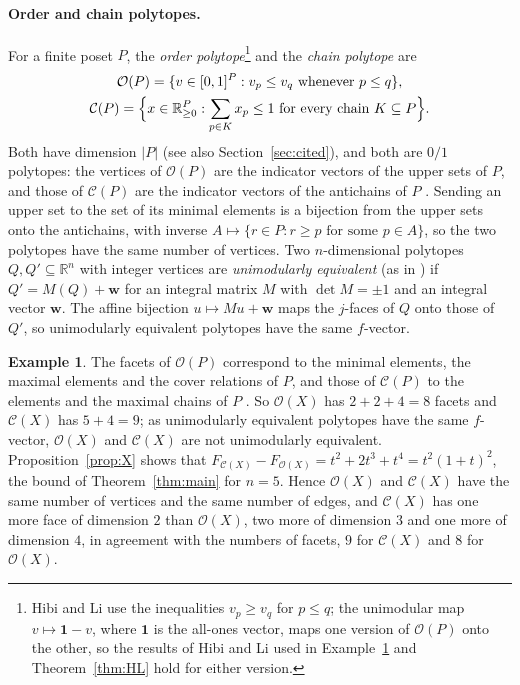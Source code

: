 \documentclass[11pt]{article}
\theoremstyle{definition}
\newtheorem{example}[theorem]{Example}
\theoremstyle{remark}
\newcommand{\OO}{\mathcal O}
\newcommand{\CC}{\mathcal C}
\begin{document}
\paragraph{Order and chain polytopes.}
For a finite poset $P$, the \emph{order polytope}\footnote{Hibi and Li \cite{HL} use the inequalities $v_p\geq v_q$ for $p\leq q$; the unimodular map $v\mapsto\mathbf1-v$, where $\mathbf1$ is the all-ones vector, maps one version of $\OO(P)$ onto the other, so the results of Hibi and Li used in Example~\ref{ex:X} and Theorem~\ref{thm:HL} hold for either version.} and the \emph{chain polytope} are
\begin{gather*}
\OO(P)=\{v\in[0,1]^P: v_p\leq v_q \text{ whenever } p\leq q\},\\
\CC(P)=\Bigl\{x\in\mathbb R_{\geq0}^P:\sum_{p\in K}x_p\leq1
 \text{ for every chain } K\subseteq P\Bigr\}.
\end{gather*}
Both have dimension $|P|$ (see also Section~\ref{sec:cited}), and both are $0/1$ polytopes: the vertices of $\OO(P)$ are the indicator
vectors of the upper sets of $P$, and those of $\CC(P)$ are the indicator vectors of the antichains
of $P$ \cite[Corollary~1.3 and Theorem~2.2]{Stanley}. Sending an upper set to the set of its minimal elements is
a bijection from the upper sets onto the antichains, with inverse $A\mapsto\{r\in P:r\geq p\text{ for some }p\in A\}$,
so the two polytopes have the same number of vertices. Two $n$-dimensional polytopes $Q,Q'\subseteq\mathbb R^n$ with integer vertices are
\emph{unimodularly equivalent} (as in \cite{HL}) if $Q'=M(Q)+\mathbf w$
for an integral matrix $M$ with $\det M=\pm1$ and an integral vector
$\mathbf w$. The affine bijection $u\mapsto Mu+\mathbf w$ maps the $j$-faces of $Q$ onto those of $Q'$, so
unimodularly equivalent polytopes have the same $f$-vector.

\begin{example}\label{ex:X}
The facets of $\OO(P)$ correspond to the minimal elements, the maximal elements and the cover
relations of $P$, and those of $\CC(P)$ to the elements and the maximal chains of $P$
\cite[Lemma~1.1]{HL}. So $\OO(X)$ has $2+2+4=8$ facets and $\CC(X)$ has $5+4=9$; as unimodularly
equivalent polytopes have the same $f$-vector, $\OO(X)$ and $\CC(X)$ are not unimodularly equivalent.
Proposition~\ref{prop:X} shows that
$F_{\CC(X)}-F_{\OO(X)}=t^2+2t^3+t^4=t^2(1+t)^2$, the bound of
Theorem~\ref{thm:main} for $n=5$. Hence $\OO(X)$ and $\CC(X)$ have the same number of vertices and the same number of edges, and $\CC(X)$ has one more face of dimension $2$ than $\OO(X)$, two more of dimension $3$ and one more of dimension $4$, in agreement with the numbers of facets, $9$ for $\CC(X)$ and $8$ for $\OO(X)$.
\end{example}
\end{document}
